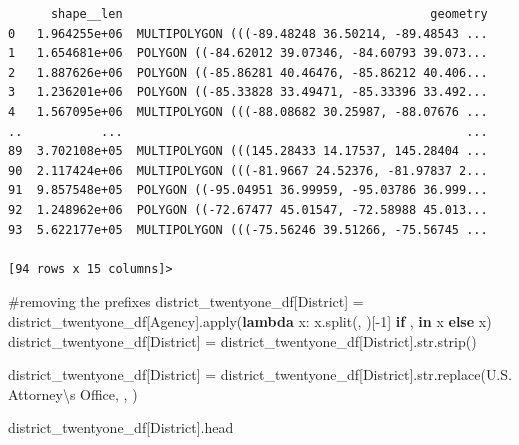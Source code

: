 \documentclass[
  letterpaper,
  DIV=11,
  numbers=noendperiod]{scrartcl}
\newenvironment{Shaded}{\begin{snugshade}}{\end{snugshade}}
\newcommand{\BuiltInTok}[1]{\textcolor[rgb]{0.00,0.23,0.31}{#1}}
\newcommand{\CharTok}[1]{\textcolor[rgb]{0.13,0.47,0.30}{#1}}
\newcommand{\CommentTok}[1]{\textcolor[rgb]{0.37,0.37,0.37}{#1}}
\newcommand{\ControlFlowTok}[1]{\textcolor[rgb]{0.00,0.23,0.31}{\textbf{#1}}}
\newcommand{\DecValTok}[1]{\textcolor[rgb]{0.68,0.00,0.00}{#1}}
\newcommand{\KeywordTok}[1]{\textcolor[rgb]{0.00,0.23,0.31}{\textbf{#1}}}
\newcommand{\NormalTok}[1]{\textcolor[rgb]{0.00,0.23,0.31}{#1}}
\newcommand{\OperatorTok}[1]{\textcolor[rgb]{0.37,0.37,0.37}{#1}}
\newcommand{\StringTok}[1]{\textcolor[rgb]{0.13,0.47,0.30}{#1}}
\begin{document}
\begin{verbatim}
      shape__len                                           geometry  
0   1.964255e+06  MULTIPOLYGON (((-89.48248 36.50214, -89.48543 ...  
1   1.654681e+06  POLYGON ((-84.62012 39.07346, -84.60793 39.073...  
2   1.887626e+06  POLYGON ((-85.86281 40.46476, -85.86212 40.406...  
3   1.236201e+06  POLYGON ((-85.33828 33.49471, -85.33396 33.492...  
4   1.567095e+06  MULTIPOLYGON (((-88.08682 30.25987, -88.07676 ...  
..           ...                                                ...  
89  3.702108e+05  MULTIPOLYGON (((145.28433 14.17537, 145.28404 ...  
90  2.117424e+06  MULTIPOLYGON (((-81.9667 24.52376, -81.97837 2...  
91  9.857548e+05  POLYGON ((-95.04951 36.99959, -95.03786 36.999...  
92  1.248962e+06  POLYGON ((-72.67477 45.01547, -72.58988 45.013...  
93  5.622177e+05  MULTIPOLYGON (((-75.56246 39.51266, -75.56745 ...  

[94 rows x 15 columns]>
\end{verbatim}

\begin{Shaded}
\begin{Highlighting}[]
\CommentTok{\#removing the prefixes}
\NormalTok{district\_twentyone\_df[}\StringTok{\textquotesingle{}District\textquotesingle{}}\NormalTok{] }\OperatorTok{=}\NormalTok{ district\_twentyone\_df[}\StringTok{\textquotesingle{}Agency\textquotesingle{}}\NormalTok{].}\BuiltInTok{apply}\NormalTok{(}\KeywordTok{lambda}\NormalTok{ x: x.split(}\StringTok{\textquotesingle{}, \textquotesingle{}}\NormalTok{)[}\OperatorTok{{-}}\DecValTok{1}\NormalTok{] }\ControlFlowTok{if} \StringTok{\textquotesingle{}, \textquotesingle{}} \KeywordTok{in}\NormalTok{ x }\ControlFlowTok{else}\NormalTok{ x)}
\NormalTok{district\_twentyone\_df[}\StringTok{\textquotesingle{}District\textquotesingle{}}\NormalTok{] }\OperatorTok{=}\NormalTok{ district\_twentyone\_df[}\StringTok{\textquotesingle{}District\textquotesingle{}}\NormalTok{].}\BuiltInTok{str}\NormalTok{.strip()}

\NormalTok{district\_twentyone\_df[}\StringTok{\textquotesingle{}District\textquotesingle{}}\NormalTok{] }\OperatorTok{=}\NormalTok{ district\_twentyone\_df[}\StringTok{\textquotesingle{}District\textquotesingle{}}\NormalTok{].}\BuiltInTok{str}\NormalTok{.replace(}\StringTok{\textquotesingle{}U.S. Attorney}\CharTok{\textbackslash{}\textquotesingle{}}\StringTok{s Office, \textquotesingle{}}\NormalTok{, }\StringTok{\textquotesingle{}\textquotesingle{}}\NormalTok{)}

\NormalTok{district\_twentyone\_df[}\StringTok{\textquotesingle{}District\textquotesingle{}}\NormalTok{].head}
\end{Highlighting}
\end{Shaded}
\end{document}
